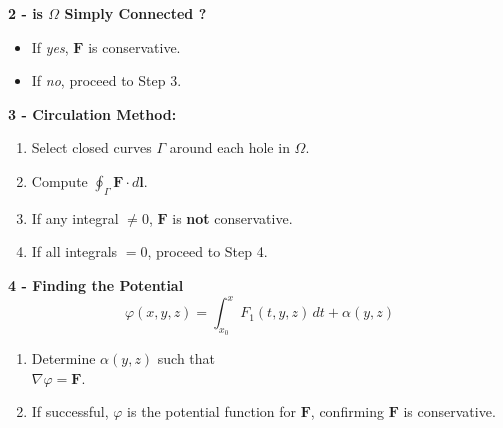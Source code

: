 \documentclass[8pt]{article}
\begin{document}
\begin{minipage}[t]{0.25\textwidth}
	\noindent\textbf{2 - is $\Omega$ Simply Connected ?} \vspace{-8px}
	\begin{itemize}[leftmargin=*]
		\setlength\itemsep{-4px}
		\item[-] If \textit{yes}, $\mathbf{F}$ is conservative.
		\item[-] If \textit{no}, proceed to Step 3.
	\end{itemize}
	\hspace{20px}

\end{minipage}
\hfill
\begin{minipage}[t]{0.23\textwidth}
	\noindent\textbf{3 - Circulation Method:} \vspace{-8px}
	\begin{enumerate}[leftmargin=*]
		\setlength\itemsep{-4px}
		\item Select closed curves $\Gamma$ around each hole in $\Omega$.
		\item Compute $\oint_{\Gamma} \mathbf{F} \cdot d\mathbf{l}$.
		\item If any integral $\neq 0$, $\mathbf{F}$ is \textbf{not} conservative.
		\item If all integrals $=0$, proceed to Step 4.
	\end{enumerate}
\end{minipage}
\hfill
\begin{minipage}[t]{0.29\textwidth}
	\noindent\textbf{4 - Finding the Potential} \vspace{-8px}
	\[
		\varphi(x,y,z) = \int_{x_0}^x F_1(t,y,z) \, dt + \alpha(y,z)
	\] \vspace{-25px}

	\begin{enumerate}[leftmargin=*]
		\setlength\itemsep{-4px} %
		\item Determine $\alpha(y,z)$ such that \\ $\nabla \varphi = \mathbf{F}$.
		\item If successful, $\varphi$ is the potential function for $\mathbf{F}$, confirming $\mathbf{F}$ is conservative.
	\end{enumerate}
\end{minipage}\\
\end{document}
